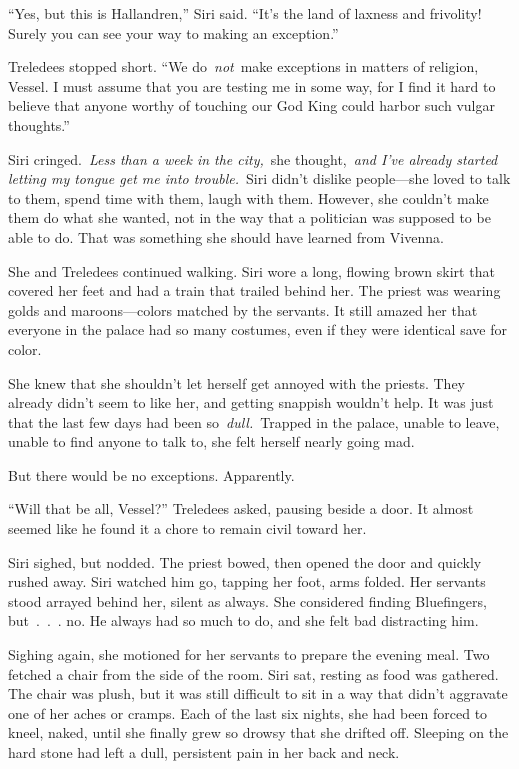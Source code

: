 “Yes, but this is Hallandren,” Siri said. “It’s the land of laxness and frivolity! Surely you can see your way to making an exception.”

Treledees stopped short. “We do~\textit{not}~make exceptions in matters of religion, Vessel. I must assume that you are testing me in some way, for I find it hard to believe that anyone worthy of touching our God King could harbor such vulgar thoughts.”

Siri cringed.~\textit{Less than a week in the city,}~she thought,~\textit{and I’ve already started letting my tongue get me into trouble.}~Siri didn’t dislike people—she loved to talk to them, spend time with them, laugh with them. However, she couldn’t make them do what she wanted, not in the way that a politician was supposed to be able to do. That was something she should have learned from Vivenna.

She and Treledees continued walking. Siri wore a long, flowing brown skirt that covered her feet and had a train that trailed behind her. The priest was wearing golds and maroons—colors matched by the servants. It still amazed her that everyone in the palace had so many costumes, even if they were identical save for color.

She knew that she shouldn’t let herself get annoyed with the priests. They already didn’t seem to like her, and getting snappish wouldn’t help. It was just that the last few days had been so~\textit{dull.}~Trapped in the palace, unable to leave, unable to find anyone to talk to, she felt herself nearly going mad.

But there would be no exceptions. Apparently.

“Will that be all, Vessel?” Treledees asked, pausing beside a door. It almost seemed like he found it a chore to remain civil toward her.

Siri sighed, but nodded. The priest bowed, then opened the door and quickly rushed away. Siri watched him go, tapping her foot, arms folded. Her servants stood arrayed behind her, silent as always. She considered finding Bluefingers, but~.~.~. no. He always had so much to do, and she felt bad distracting him.

Sighing again, she motioned for her servants to prepare the evening meal. Two fetched a chair from the side of the room. Siri sat, resting as food was gathered. The chair was plush, but it was still difficult to sit in a way that didn’t aggravate one of her aches or cramps. Each of the last six nights, she had been forced to kneel, naked, until she finally grew so drowsy that she drifted off. Sleeping on the hard stone had left a dull, persistent pain in her back and neck.

